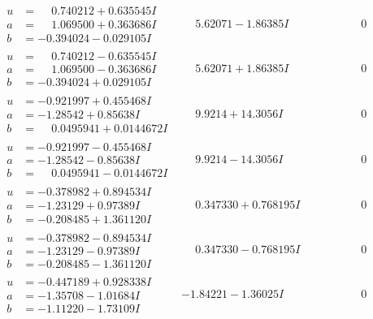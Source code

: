 \documentclass[1p]{elsarticle_modified}
\theoremstyle{definition}
\begin{document}
$$\begin{array}{c|c|c}
\begin{aligned}
u &= \phantom{-}0.740212 + 0.635545 I \\
a &= \phantom{-}1.069500 + 0.363686 I \\
b &= -0.394024 - 0.029105 I\end{aligned}
 & \phantom{-}5.62071 - 1.86385 I & \phantom{-0.000000 } 0 \\ \hline\begin{aligned}
u &= \phantom{-}0.740212 - 0.635545 I \\
a &= \phantom{-}1.069500 - 0.363686 I \\
b &= -0.394024 + 0.029105 I\end{aligned}
 & \phantom{-}5.62071 + 1.86385 I & \phantom{-0.000000 } 0 \\ \hline\begin{aligned}
u &= -0.921997 + 0.455468 I \\
a &= -1.28542 + 0.85638 I \\
b &= \phantom{-}0.0495941 + 0.0144672 I\end{aligned}
 & \phantom{-}9.9214 + 14.3056 I & \phantom{-0.000000 } 0 \\ \hline\begin{aligned}
u &= -0.921997 - 0.455468 I \\
a &= -1.28542 - 0.85638 I \\
b &= \phantom{-}0.0495941 - 0.0144672 I\end{aligned}
 & \phantom{-}9.9214 - 14.3056 I & \phantom{-0.000000 } 0 \\ \hline\begin{aligned}
u &= -0.378982 + 0.894534 I \\
a &= -1.23129 + 0.97389 I \\
b &= -0.208485 + 1.361120 I\end{aligned}
 & \phantom{-}0.347330 + 0.768195 I & \phantom{-0.000000 } 0 \\ \hline\begin{aligned}
u &= -0.378982 - 0.894534 I \\
a &= -1.23129 - 0.97389 I \\
b &= -0.208485 - 1.361120 I\end{aligned}
 & \phantom{-}0.347330 - 0.768195 I & \phantom{-0.000000 } 0 \\ \hline\begin{aligned}
u &= -0.447189 + 0.928338 I \\
a &= -1.35708 - 1.01684 I \\
b &= -1.11220 - 1.73109 I\end{aligned}
 & -1.84221 - 1.36025 I & \phantom{-0.000000 } 0 \\ \hline\begin{aligned}

\end{aligned}
\end{array}$$
\end{document}
